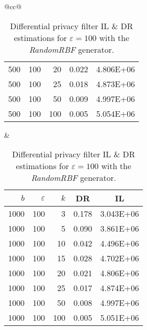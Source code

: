 \begin{table}[H]
\begin{tabular}{@{}cc@{}}
\begin{tabular}{@{}rrrrr@{}}
			500	&	100	&	20	&	0.022	&	4.806E+06 \\
			500	&	100	&	25	&	0.018	&	4.873E+06 \\
			500	&	100	&	50	&	0.009	&	4.997E+06 \\
			500	&	100	&	100	&	0.005	&	5.054E+06 \\
		\end{tabular}
		&
		\begin{tabular}{@{}rrrrr@{}}
			\toprule
			$b$ & $\varepsilon$ & $k$ & \multicolumn{1}{c}{DR} & \multicolumn{1}{c}{IL} \\ \midrule
			1000	&	100	&	3	&	0.178	&	3.043E+06 \\
			1000	&	100	&	5	&	0.090	&	3.861E+06 \\
			1000	&	100	&	10	&	0.042	&	4.496E+06 \\
			1000	&	100	&	15	&	0.028	&	4.702E+06 \\
			1000	&	100	&	20	&	0.021	&	4.806E+06 \\
			1000	&	100	&	25	&	0.017	&	4.874E+06 \\
			1000	&	100	&	50	&	0.008	&	4.997E+06 \\
			1000	&	100	&	100	&	0.005	&	5.051E+06 \\
		\end{tabular}
	\end{tabular}
	\caption[Differential privacy filter DR \& IL estimations (RandomRBF), $\varepsilon = 100$.]{Differential privacy filter IL \& DR estimations for $\varepsilon = 100$ with the \textit{RandomRBF} generator.}
	\label{table:results-wave-diff-priv-e100}
\end{table}